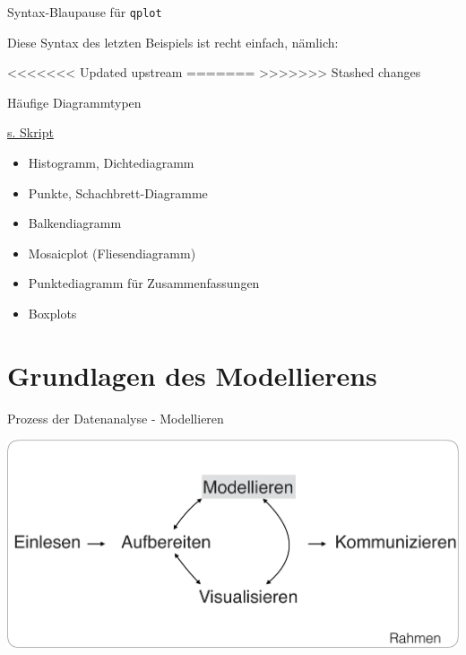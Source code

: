 \begin{frame}[fragile]{Syntax-Blaupause für \texttt{qplot}}

Diese Syntax des letzten Beispiels ist recht einfach, nämlich:

\begin{Shaded}
\begin{Highlighting}[]
<<<<<<< Updated upstream
\NormalTok{(} \NormalTok{)}
=======
\NormalTok{(}    \NormalTok{)}
>>>>>>> Stashed changes
\end{Highlighting}
\end{Shaded}

\end{frame}

\begin{frame}{Häufige Diagrammtypen}

\href{https://sebastiansauer.github.io/Praxis_der_Datenanalyse/daten-visualisieren.html\#haufige-arten-von-diagrammen}{s.
Skript}

\begin{itemize}
\tightlist
\item
  Histogramm, Dichtediagramm
\item
  Punkte, Schachbrett-Diagramme
\item
  Balkendiagramm
\item
  Mosaicplot (Fliesendiagramm)
\item
  Punktediagramm für Zusammenfassungen
\item
  Boxplots
\end{itemize}

\end{frame}

\section{Grundlagen des Modellierens}\label{mod}

\begin{frame}{Prozess der Datenanalyse - Modellieren}

\begin{center}\includegraphics[width=0.7\linewidth]{../images/modellieren/Modellieren} \end{center}

\end{frame}

